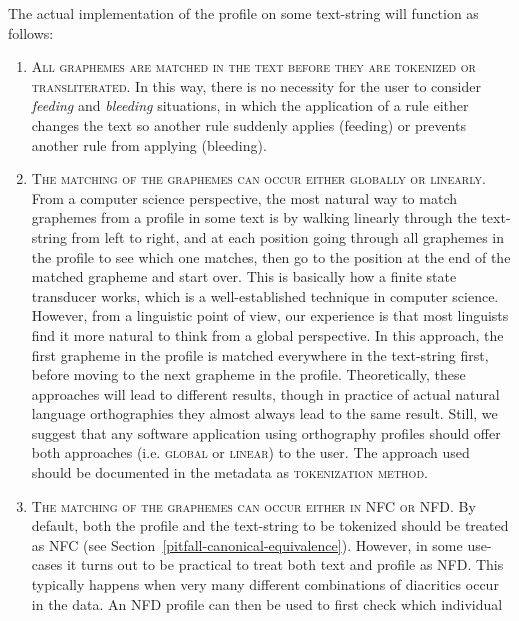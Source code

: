 \noindent The actual implementation of the profile on some text-string will function as
follows:

\begin{enumerate}
	\def\labelenumi{B\arabic{enumi}.} \setcounter{enumi}{4} 
	\item \textsc{All graphemes are matched in the text before they are tokenized
       or transliterated}. In this way, there is no necessity for the user to
       consider \textit{feeding} and \textit{bleeding} situations, in which the application of
       a rule either changes the text so another rule suddenly applies (feeding)
       or prevents another rule from applying (bleeding). 
	\item \textsc{The matching of the graphemes can occur either globally or
       linearly.} From a computer science perspective, the most natural way to
       match graphemes from a profile in some text is by walking linearly
       through the text-string from left to right, and at each position going
       through all graphemes in the profile to see which one matches, then go to
       the position at the end of the matched grapheme and start over. This is
       basically how a finite state transducer works, which is a
       well-established technique in computer science. However, from a
       linguistic point of view, our experience is that most linguists find it
       more natural to think from a global perspective. In this approach, the
       first grapheme in the profile is matched everywhere in the text-string
       first, before moving to the next grapheme in the profile. Theoretically,
       these approaches will lead to different results, though in practice of
       actual natural language orthographies they almost always lead to the same
       result. Still, we suggest that any software application using orthography
       profiles should offer both approaches (i.e. \textsc{global} or
       \textsc{linear}) to the user. The approach used should be documented in
       the metadata as \textsc{tokenization method}. 
	\item \textsc{The matching of the graphemes can occur either in NFC or NFD.} By
       default, both the profile and the text-string to be tokenized should be
       treated as NFC (see Section~\ref{pitfall-canonical-equivalence}). However, in some use-cases it turns out to
       be practical to treat both text and profile as NFD. This typically
       happens when very many different combinations of diacritics occur in the
       data. An NFD profile can then be used to first check which individual

\end{enumerate}
